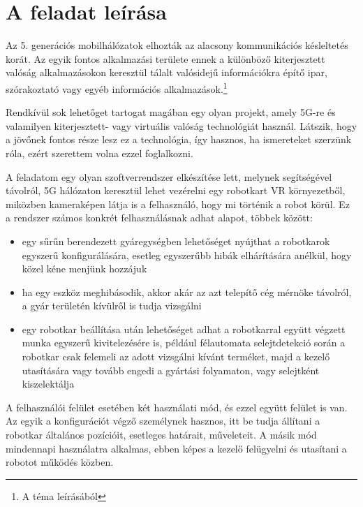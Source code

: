 \documentclass[11pt,a4paper,oneside]{article}
\author{\vikszerzo}
\title{\viktitle}
\begin{document}


\onehalfspacing

\clearpage
\singlespacing

\tableofcontents

\clearpage
\singlespacing
{}

\section{A feladat leírása}

Az 5. generációs mobilhálózatok elhozták az alacsony kommunikációs késleltetés korát. Az egyik fontos alkalmazási területe ennek a különböző kiterjesztett valóság alkalmazásokon keresztül tálalt valósidejű információkra építő ipar, szórakoztató vagy egyéb információs alkalmazások.\footnote{A téma leírásából}

Rendkívül sok lehetőget tartogat magában egy olyan projekt, amely 5G-re és valamilyen kiterjesztett- vagy virtuális valóság technológiát használ. Látszik, hogy a jövőnek fontos része lesz ez a technológia, így hasznos, ha ismereteket szerzünk róla, ezért szerettem volna ezzel foglalkozni.

A feladatom egy olyan szoftverrendszer elkészítése lett, melynek segítségével távolról, 5G hálózaton keresztül lehet vezérelni egy robotkart VR környezetből, miközben kameraképen látja is a felhasználó, hogy mi történik a robot körül. Ez a rendszer számos konkrét felhasználásnak adhat alapot, többek között:
\begin{itemize}
  \item egy sűrűn berendezett gyáregységben lehetőséget nyújthat a robotkarok egyszerű konfigurálására, esetleg egyszerűbb hibák elhárítására anélkül, hogy közel kéne menjünk hozzájuk
  \item ha egy eszköz meghibásodik, akkor akár az azt telepítő cég mérnöke távolról, a gyár területén kívülről is tudja vizsgálni
  \item egy robotkar beállítása után lehetőséget adhat a robotkarral együtt végzett munka egyszerű kivitelezésére is, például félautomata selejtdetekció során a robotkar csak felemeli az adott vizsgálni kívánt terméket, majd a kezelő utasítására vagy tovább engedi a gyártási folyamaton, vagy selejtként kiszelektálja
\end{itemize}

A felhasználói felület esetében két használati mód, és ezzel együtt felület is van. Az egyik a konfigurációt végző személynek hasznos, itt be tudja állítani a robotkar általános pozícióit, esetleges határait, műveleteit. A másik mód mindennapi használatra alkalmas, ebben képes a kezelő felügyelni és utasítani a robotot működés közben.
\end{document}
